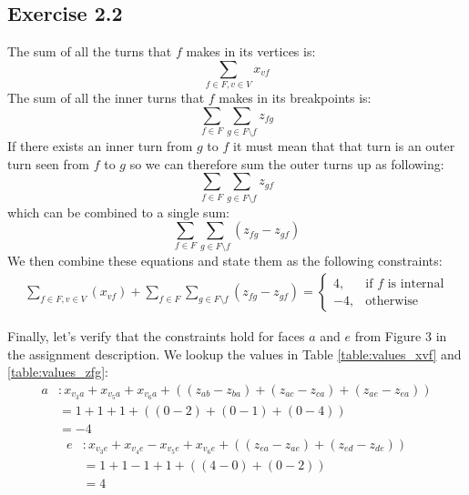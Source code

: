 \documentclass[12pt]{article}
\begin{document}
\subsection*{Exercise 2.2}
  
  The sum of all the turns that $f$ makes in its vertices is:
  $$\sum_{f \in F, v \in V}{x_{vf}}$$
  The sum of all the inner turns that $f$ makes in its breakpoints is:
  $$\sum_{f \in F}\sum_{g \in F \setminus f}z_{fg}$$
  If there exists an inner turn from $g$ to $f$ it must mean that that turn is an outer turn seen from $f$ to $g$ so we can therefore sum the outer turns up as following:
  $$\sum_{f \in F}\sum_{g \in F \setminus f}z_{gf}$$
  which can be combined to a single sum:
  $$\sum_{f \in F}\sum_{g \in F \setminus f}(z_{fg} - z_{gf})$$
  We then combine these equations and state them as the following constraints:
  \begin{align*}
      \sum_{f \in F, v \in V}(x_{vf}) + \sum_{f \in F}\sum_{g \in F \setminus f}(z_{fg} - z_{gf}) = \begin{cases}
                                                                                       4, & \text{if } f \text{ is internal}\\
                                                                                      -4, & \text{otherwise}
                                                                                   \end{cases}
  \end{align*}

  Finally, let's verify that the constraints hold for faces $a$ and $e$ from Figure 3 in the assignment description. We lookup the values in Table \ref{table:values_xvf} and \ref{table:values_zfg}:
  \begin{align*}
    a &: x_{v_{3}a} + x_{v_{5}a} + x_{v_{6}a} + ((z_{ab} - z_{ba}) + (z_{ac} - z_{ca}) + (z_{ae} - z_{ea}))\\
      &= 1 + 1 + 1 + ((0 - 2) + (0 - 1) + (0 - 4)) \\
      &= -4
  \end{align*}
  \begin{align*}
    e &: x_{v_{3}e} + x_{v_{4}e} - x_{v_{5}e} + x_{v_{6}e} + ((z_{ea} - z_{ae}) + (z_{ed} - z_{de}))\\
      &= 1 + 1 -1 + 1 + ((4 - 0) + (0 - 2)) \\
      &= 4
  \end{align*}
\end{document}
